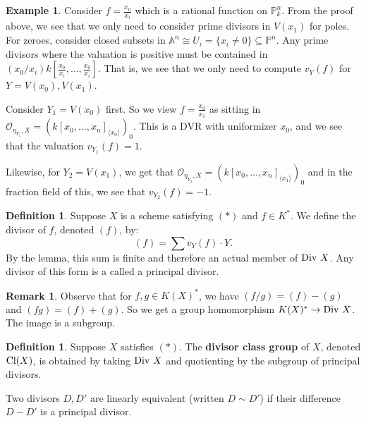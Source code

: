 \documentclass[10pt,reqno]{amsart}
\theoremstyle{definition}
\newtheorem{example}[theorem]{Example}
\newtheorem{definition}[theorem]{Definition}
\newtheorem{remark}[theorem]{Remark}
\theoremstyle{remark}
\numberwithin{equation}{section}
\numberwithin{theorem}{section}
\newcommand{\OO}{{\mathcal O}}
\newcommand{\Div}{\textup{Div }}
\newcommand{\cl}{\textup{Cl}}
\newcommand{\A}{{\mathbb A}}
\newcommand{\PP}{{\mathbb P}}
\begin{document}
\begin{example}
Consider $f = \frac{x_0}{x_i}$ which is a rational function on $\PP^n_k$. From the proof above, we see that we only need to consider prime divisors in $V(x_1)$ for poles. For zeroes, consider closed subsets in $\A^n \cong U_i = \{x_i \ne 0\} \subseteq \PP^n$. Any prime divisors where the valuation is positive must be contained in $(x_0/x_i)k[\frac{x_0}{x_i},\dots,\frac{x_0}{x_i}]$. That is, we see that we only need to compute $v_{Y}(f)$ for $Y = V(x_0), V(x_1)$.

Consider $Y_1 = V(x_0)$ first. So we view $f = \frac{x_0}{x_1}$ as sitting in $\OO_{\eta_{Y_1},X} = (k[x_0,\dots,x_n]_{\langle x_0 \rangle})_{0}$. This is a DVR with uniformizer $x_0$, and we see that the valuation $v_{Y_1}(f) = 1$.

Likewise, for $Y_2 = V(x_1)$, we get that $\OO_{\eta_{Y_2},X} = (k[x_0,\dots,x_n]_{\langle x_1 \rangle})_{0}$ and in the fraction field of this, we see that $v_{Y_2}(f) = -1$.
\end{example}

\begin{definition} Suppose $X$ is a scheme satisfying $(\ast)$ and $f \in K^*$. We define the divisor of $f$, denoted $(f)$, by:
\[(f) = \sum v_Y(f) \cdot Y.\]
By the lemma, this sum is finite and therefore an actual member of $\Div X$. Any divisor of this form is a called a principal divisor.
\end{definition}

\begin{remark} Observe that for $f,g \in K(X)^*$, we have $(f/g) = (f) - (g)$ and $(fg) = (f) + (g)$. So we get a group homomorphism $K(X)^* \to \Div X$. The image is a subgroup.
\end{remark}

\begin{definition}Suppose $X$ satisfies $(\ast)$. The \textbf{divisor class group} of $X$, denoted $\cl(X)$, is obtained by taking $\Div X$ and quotienting by the subgroup of principal divisors.

Two divisors $D,D'$ are linearly equivalent (written $D \sim D'$) if their difference $D - D'$ is a principal divisor.
\end{definition}
\end{document}
